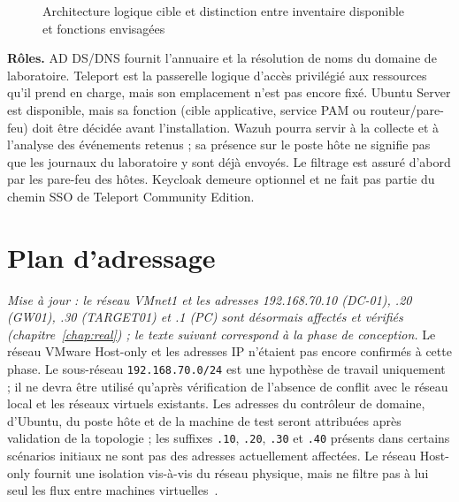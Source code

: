 \documentclass[11pt,a4paper]{report}
\begin{document}
\begin{figure}[htbp]
\caption{Architecture logique cible et distinction entre inventaire disponible et fonctions envisagées}
\label{fig:architecture-logique}
\end{figure}

\textbf{Rôles.} AD DS/DNS fournit l'annuaire et la résolution de noms du domaine de laboratoire. Teleport est la passerelle logique d'accès privilégié aux ressources qu'il prend en charge, mais son emplacement n'est pas encore fixé. Ubuntu Server est disponible, mais sa fonction (cible applicative, service PAM ou routeur/pare-feu) doit être décidée avant l'installation. Wazuh pourra servir à la collecte et à l'analyse des événements retenus ; sa présence sur le poste hôte ne signifie pas que les journaux du laboratoire y sont déjà envoyés. Le filtrage est assuré d'abord par les pare-feu des hôtes. Keycloak demeure optionnel et ne fait pas partie du chemin SSO de Teleport Community Edition.

\section{Plan d'adressage}
\textit{Mise à jour : le réseau VMnet1 et les adresses 192.168.70.10 (DC-01), .20 (GW01), .30 (TARGET01) et .1 (PC) sont désormais affectés et vérifiés (chapitre~\ref{chap:real}) ; le texte suivant correspond à la phase de conception.} Le réseau VMware Host-only et les adresses IP n'étaient pas encore confirmés à cette phase. Le sous-réseau \texttt{192.168.70.0/24} est une hypothèse de travail uniquement ; il ne devra être utilisé qu'après vérification de l'absence de conflit avec le réseau local et les réseaux virtuels existants. Les adresses du contrôleur de domaine, d'Ubuntu, du poste hôte et de la machine de test seront attribuées après validation de la topologie ; les suffixes \texttt{.10}, \texttt{.20}, \texttt{.30} et \texttt{.40} présents dans certains scénarios initiaux ne sont pas des adresses actuellement affectées. Le réseau Host-only fournit une isolation vis-à-vis du réseau physique, mais ne filtre pas à lui seul les flux entre machines virtuelles~\cite{vmware-ho}.
\end{document}
